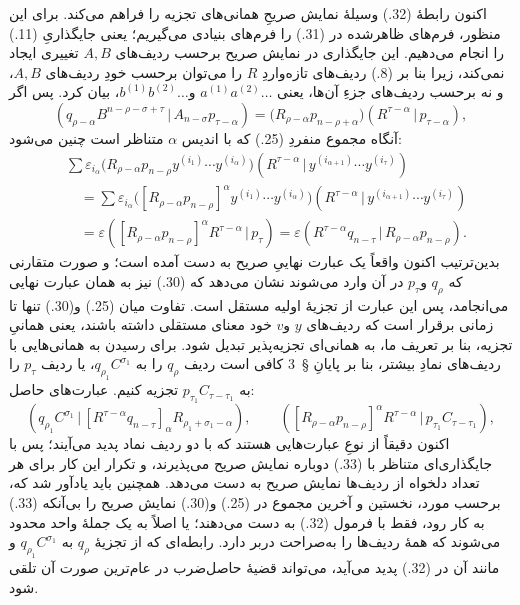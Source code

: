 \documentclass[11pt]{article}
\providecommand{\pair}[2]{(#1\,|\,#2)}
\providecommand{\eps}{\varepsilon}
\begin{document}
اکنون رابطهٔ (32.) وسیلهٔ نمایش صریحِ همانی‌های تجزیه را فراهم می‌کند. برای این منظور، فرم‌های ظاهرشده در (31.) را فرم‌های بنیادی می‌گیریم؛ یعنی جایگذاریِ (11.) را انجام می‌دهیم. این جایگذاری در نمایش صریح برحسب ردیف‌های $A,B$ تغییری ایجاد نمی‌کند، زیرا بنا بر (8.) ردیف‌های تازه‌واردِ $R$ را می‌توان برحسب خودِ ردیف‌های $A,B$، و نه برحسب ردیف‌های جزءِ آن‌ها، یعنی $a^{(1)}a^{(2)}\ldots$ و$b^{(1)}b^{(2)}\ldots$، بیان کرد. پس اگر
\begin{equation}
 \pair{q_{\rho-\alpha}B^{n-\rho-\sigma+\tau}}{A_{n-\sigma}p_{\tau-\alpha}}
 =\bigl(R_{\rho-\alpha}p_{n-\rho+\alpha}\bigr)
  \pair{R^{\tau-\alpha}}{p_{\tau-\alpha}},
\tag{33}
\end{equation}
آنگاه مجموع منفردِ (25.) که با اندیس $\alpha$ متناظر است چنین می‌شود:
\begin{equation}
\begin{aligned}
&\sum \eps_{i_\alpha}\bigl(R_{\rho-\alpha}p_{n-\rho}y^{(i_1)}\cdots y^{(i_\alpha)}\bigr)
 \pair{R^{\tau-\alpha}}{y^{(i_{\alpha+1})}\cdots y^{(i_\tau)}}\\
&\quad=\sum \eps_{i_\alpha}\bigl([R_{\rho-\alpha}p_{n-\rho}]^\alpha y^{(i_1)}\cdots y^{(i_\alpha)}\bigr)
 \pair{R^{\tau-\alpha}}{y^{(i_{\alpha+1})}\cdots y^{(i_\tau)}}\\
&\quad=\eps\pair{[R_{\rho-\alpha}p_{n-\rho}]^\alpha R^{\tau-\alpha}}{p_\tau}
 =\eps\pair{R^{\tau-\alpha}q_{n-\tau}}{R_{\rho-\alpha}p_{n-\rho}}.
\end{aligned}
\tag{34}
\end{equation}
بدین‌ترتیب اکنون واقعاً یک عبارت نهاییِ صریح به دست آمده است؛ و صورت متقارنی که $q_\rho$ و$p_\tau$ در آن وارد می‌شوند نشان می‌دهد که (30.) نیز به همان عبارت نهایی می‌انجامد، پس این عبارت از تجزیهٔ اولیه مستقل است. تفاوت میان (25.) و(30.) تنها تا زمانی برقرار است که ردیف‌های $y$ و$v$ خود معنای مستقلی داشته باشند، یعنی همانیِ تجزیه، بنا بر تعریف ما، به همانی‌ای تجزیه‌پذیر تبدیل شود. برای رسیدن به همانی‌هایی با ردیف‌های نمادِ بیشتر، بنا بر پایانِ \S\ 3 کافی است ردیف $q_\rho$ را به $q_{\rho_1}C^{\sigma_1}$، یا ردیف $p_\tau$ را به $p_{\tau_1}C_{\tau-\tau_1}$ تجزیه کنیم. عبارت‌های حاصل:
\begin{equation}
 \pair{q_{\rho_1}C^{\sigma_1}}{[R^{\tau-\alpha}q_{n-\tau}]_\alpha R_{\rho_1+\sigma_1-\alpha}},
 \qquad
 \pair{[R_{\rho-\alpha}p_{n-\rho}]^\alpha R^{\tau-\alpha}}{p_{\tau_1}C_{\tau-\tau_1}},
\tag{35}
\end{equation}
اکنون دقیقاً از نوعِ عبارت‌هایی هستند که با دو ردیف نماد پدید می‌آیند؛ پس با جایگذاری‌ای متناظر با (33.) دوباره نمایش صریح می‌پذیرند، و تکرار این کار برای هر تعداد دلخواه از ردیف‌ها نمایش صریح به دست می‌دهد. همچنین باید یادآور شد که، برحسب مورد، نخستین و آخرین مجموع در (25.) و(30.) نمایش صریح را بی‌آنکه (33.) به کار رود، فقط با فرمول (32.) به دست می‌دهند؛ یا اصلاً به یک جملهٔ واحد محدود می‌شوند که همهٔ ردیف‌ها را به‌صراحت دربر دارد. رابطه‌ای که از تجزیهٔ $q_\rho$ به $q_{\rho_1}C^{\sigma_1}$ و مانند آن در (32.) پدید می‌آید، می‌تواند قضیهٔ حاصل‌ضرب در عام‌ترین صورت آن تلقی شود.
\end{document}
